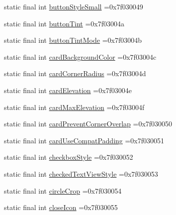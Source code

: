\begin{DoxyCompactItemize}
\item 
static final int \mbox{\hyperlink{classbr_1_1unb_1_1cic_1_1mp_1_1marketmaster_1_1R_1_1attr_ae2e132e0d6784af843a6c62257dd6bf2}{button\+Style\+Small}} =0x7f030049
\item 
static final int \mbox{\hyperlink{classbr_1_1unb_1_1cic_1_1mp_1_1marketmaster_1_1R_1_1attr_a8a9f8e3996ae46a3c224f6bca1182e5a}{button\+Tint}} =0x7f03004a
\item 
static final int \mbox{\hyperlink{classbr_1_1unb_1_1cic_1_1mp_1_1marketmaster_1_1R_1_1attr_ae1bf5e744d5e3d2c8e4755ef78ef4307}{button\+Tint\+Mode}} =0x7f03004b
\item 
static final int \mbox{\hyperlink{classbr_1_1unb_1_1cic_1_1mp_1_1marketmaster_1_1R_1_1attr_a90b0debd86a100ec65ab3071e4f06df9}{card\+Background\+Color}} =0x7f03004c
\item 
static final int \mbox{\hyperlink{classbr_1_1unb_1_1cic_1_1mp_1_1marketmaster_1_1R_1_1attr_a6d611441c9d8939eeb9bf9f002d332e5}{card\+Corner\+Radius}} =0x7f03004d
\item 
static final int \mbox{\hyperlink{classbr_1_1unb_1_1cic_1_1mp_1_1marketmaster_1_1R_1_1attr_a4304b5dff0c9652f10b43d2329345b23}{card\+Elevation}} =0x7f03004e
\item 
static final int \mbox{\hyperlink{classbr_1_1unb_1_1cic_1_1mp_1_1marketmaster_1_1R_1_1attr_a2e8b0ca3f41d7b8f43be9b09020f5eac}{card\+Max\+Elevation}} =0x7f03004f
\item 
static final int \mbox{\hyperlink{classbr_1_1unb_1_1cic_1_1mp_1_1marketmaster_1_1R_1_1attr_a5d472ed69ec7c98c90bf7c6c79e7cb45}{card\+Prevent\+Corner\+Overlap}} =0x7f030050
\item 
static final int \mbox{\hyperlink{classbr_1_1unb_1_1cic_1_1mp_1_1marketmaster_1_1R_1_1attr_a2159f58aaf9a70f0607575f78431e0db}{card\+Use\+Compat\+Padding}} =0x7f030051
\item 
static final int \mbox{\hyperlink{classbr_1_1unb_1_1cic_1_1mp_1_1marketmaster_1_1R_1_1attr_a14af3b9630e038b09356250ff3830f9a}{checkbox\+Style}} =0x7f030052
\item 
static final int \mbox{\hyperlink{classbr_1_1unb_1_1cic_1_1mp_1_1marketmaster_1_1R_1_1attr_add4ac49da002932047ad03dd7db92f99}{checked\+Text\+View\+Style}} =0x7f030053
\item 
static final int \mbox{\hyperlink{classbr_1_1unb_1_1cic_1_1mp_1_1marketmaster_1_1R_1_1attr_a69dc8d296c849c935f967d7e34b4f9ee}{circle\+Crop}} =0x7f030054
\item 
static final int \mbox{\hyperlink{classbr_1_1unb_1_1cic_1_1mp_1_1marketmaster_1_1R_1_1attr_ad934343bc7317b9592defa766c30ddb9}{close\+Icon}} =0x7f030055

\end{DoxyCompactItemize}
